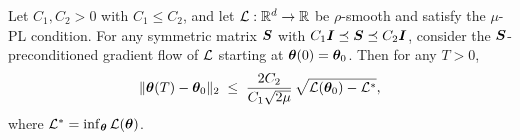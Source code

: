 \begin{lemma}\label{lem:traj-bound-by-L}
    Let $C_1,C_2>0$ with $C_1\le C_2$, and let $\mathcal{L}:\mathbb{R}^d\to\mathbb{R}$ be $\rho$-smooth and satisfy the $\mu$-PL condition. For any symmetric matrix ${\bm{S}}$ with $C_1{\bm{I}} \preceq {\bm{S}} \preceq C_2{\bm{I}}$, consider the ${\bm{S}}$-preconditioned gradient flow of $\mathcal{L}$ starting at ${\bm{\theta}}(0)={\bm{\theta}}_0$.
Then for any $T>0$,
\[
\|{\bm{\theta}}(T)-{\bm{\theta}}_0\|_2 
\;\le\; \frac{2C_2}{C_1\sqrt{2\mu}}\,
\sqrt{\mathcal{L}({\bm{\theta}}_0)-\mathcal{L}^*},
\]
where $\mathcal{L}^*=\inf_{{\bm{\theta}}}\mathcal{L}({\bm{\theta}})$.
\end{lemma}
